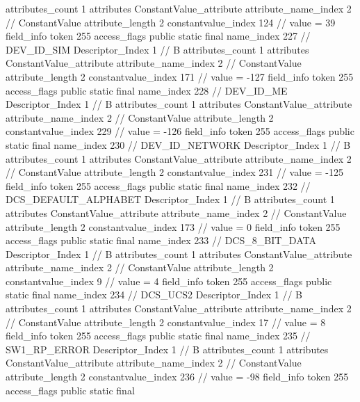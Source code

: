 {{{{{				attributes_count	1
				attributes {
				ConstantValue_attribute {
					attribute_name_index	2		// ConstantValue
					attribute_length	2
					constantvalue_index	124		// value = 39
				}
				}
			}
			field_info {
				token	255
				access_flags	public static final
				name_index	227		// DEV_ID_SIM
				Descriptor_Index	1		// B
				attributes_count	1
				attributes {
				ConstantValue_attribute {
					attribute_name_index	2		// ConstantValue
					attribute_length	2
					constantvalue_index	171		// value = -127
				}
				}
			}
			field_info {
				token	255
				access_flags	public static final
				name_index	228		// DEV_ID_ME
				Descriptor_Index	1		// B
				attributes_count	1
				attributes {
				ConstantValue_attribute {
					attribute_name_index	2		// ConstantValue
					attribute_length	2
					constantvalue_index	229		// value = -126
				}
				}
			}
			field_info {
				token	255
				access_flags	public static final
				name_index	230		// DEV_ID_NETWORK
				Descriptor_Index	1		// B
				attributes_count	1
				attributes {
				ConstantValue_attribute {
					attribute_name_index	2		// ConstantValue
					attribute_length	2
					constantvalue_index	231		// value = -125
				}
				}
			}
			field_info {
				token	255
				access_flags	public static final
				name_index	232		// DCS_DEFAULT_ALPHABET
				Descriptor_Index	1		// B
				attributes_count	1
				attributes {
				ConstantValue_attribute {
					attribute_name_index	2		// ConstantValue
					attribute_length	2
					constantvalue_index	173		// value = 0
				}
				}
			}
			field_info {
				token	255
				access_flags	public static final
				name_index	233		// DCS_8_BIT_DATA
				Descriptor_Index	1		// B
				attributes_count	1
				attributes {
				ConstantValue_attribute {
					attribute_name_index	2		// ConstantValue
					attribute_length	2
					constantvalue_index	9		// value = 4
				}
				}
			}
			field_info {
				token	255
				access_flags	public static final
				name_index	234		// DCS_UCS2
				Descriptor_Index	1		// B
				attributes_count	1
				attributes {
				ConstantValue_attribute {
					attribute_name_index	2		// ConstantValue
					attribute_length	2
					constantvalue_index	17		// value = 8
				}
				}
			}
			field_info {
				token	255
				access_flags	public static final
				name_index	235		// SW1_RP_ERROR
				Descriptor_Index	1		// B
				attributes_count	1
				attributes {
				ConstantValue_attribute {
					attribute_name_index	2		// ConstantValue
					attribute_length	2
					constantvalue_index	236		// value = -98
				}
				}
			}
			field_info {
				token	255
				access_flags	public static final
}}}}}
